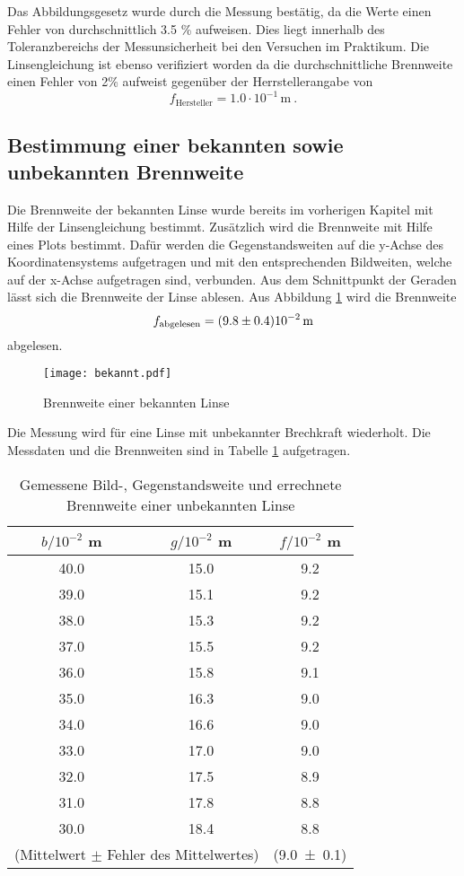 Das Abbildungsgesetz wurde durch die Messung bestätig, da die Werte einen Fehler von durchschnittlich 3.5 \% aufweisen. Dies liegt innerhalb des Toleranzbereichs der Messunsicherheit bei den Versuchen im Praktikum. Die Linsengleichung ist ebenso verifiziert worden da die durchschnittliche Brennweite einen Fehler von 2\% aufweist gegenüber der Herrstellerangabe von
\begin{equation}
  f_\text{Hersteller} = 1.0 \cdot 10^{-1} \, \text{m} \ .
  \label{eqn:fHer1}
\end{equation}
\subsection{Bestimmung einer bekannten sowie unbekannten Brennweite}
Die Brennweite der bekannten Linse wurde bereits im vorherigen Kapitel mit Hilfe der Linsengleichung bestimmt. Zusätzlich wird die Brennweite mit Hilfe eines Plots bestimmt. Dafür werden die Gegenstandsweiten auf die y-Achse des Koordinatensystems aufgetragen und mit den entsprechenden Bildweiten, welche auf der x-Achse aufgetragen sind, verbunden. Aus dem Schnittpunkt der Geraden lässt sich die Brennweite der Linse ablesen. Aus Abbildung \ref{fig:fibek} wird die Brennweite
\begin{equation}
  f_\text{abgelesen} = (\num{9.8 +- 0.4}) 10^{-2} \, \text{m}
  \label{eqn:fbek}
\end{equation}
abgelesen.
\begin{figure}
  \centering
  \texttt{[image: bekannt.pdf]}
  \caption{Brennweite einer bekannten Linse}
  \label{fig:fibek}
\end{figure}
Die Messung wird für eine Linse mit unbekannter Brechkraft wiederholt. Die Messdaten und die Brennweiten sind in Tabelle \ref{tab:funb} aufgetragen.
\begin{table}
  \centering
  \begin{tabular}{c c| c}
    \toprule
    $b/10^{-2}$ m & $g/10^{-2}$ m & $f/10^{-2}$ m\\
    \midrule
	40.0	& 15.0	& 9.2	\\
	39.0	& 15.1	& 9.2	\\
	38.0	& 15.3	& 9.2	\\
	37.0	& 15.5	& 9.2	\\
	36.0	& 15.8	& 9.1	\\
	35.0	& 16.3	& 9.0	\\
	34.0	& 16.6	& 9.0	\\
	33.0	& 17.0	& 9.0	\\
	32.0	& 17.5	& 8.9	\\
	31.0	& 17.8	& 8.8	\\
	30.0	& 18.4	& 8.8	\\
    \midrule
    	\multicolumn{2}{r|}{(Mittelwert $\pm$ Fehler des Mittelwertes)}&(\num {9.0 +- 0.1})\\
    \bottomrule
  \end{tabular}
  \caption{Gemessene Bild-, Gegenstandsweite und errechnete Brennweite einer unbekannten Linse}
  \label{tab:funb}
\end{table}
